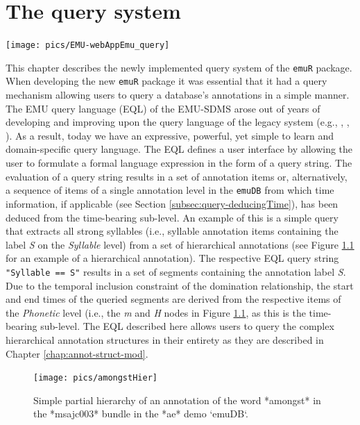 \documentclass[]{book}
\begin{document}
\hypertarget{chap:querysys}{%
\chapter{The query system}\label{chap:querysys}}

\begin{center}\texttt{[image: pics/EMU-webAppEmu\_query]} \end{center}

This chapter describes the newly implemented query system of the \texttt{emuR} package. When developing the new \texttt{emuR} package it was essential that it had a query mechanism allowing users to query a database's annotations in a simple manner. The EMU query language (EQL) of the EMU-SDMS arose out of years of developing and improving upon the query language of the legacy system (e.g., \citet{cassidy:sc2001a}, \citet{harrington:2010a}, \citet{john:2012a}). As a result, today we have an expressive, powerful, yet simple to learn and domain-specific query language. The EQL defines a user interface by allowing the user to formulate a formal language expression in the form of a query string. The evaluation of a query string results in a set of annotation items or, alternatively, a sequence of items of a single annotation level in the \texttt{emuDB} from which time information, if applicable (see Section \ref{subsec:query-deducingTime}), has been deduced from the time-bearing sub-level. An example of this is a simple query that extracts all strong syllables (i.e., syllable annotation items containing the label \emph{S} on the \emph{Syllable} level) from a set of hierarchical annotations (see Figure \ref{fig:amongstHier} for an example of a hierarchical annotation). The respective EQL query string \texttt{"Syllable\ ==\ S"} results in a set of segments containing the annotation label \emph{S}. Due to the temporal inclusion constraint of the domination relationship, the start and end times of the queried segments are derived from the respective items of the \emph{Phonetic} level (i.e., the \emph{m} and \emph{H} nodes in Figure \ref{fig:amongstHier}, as this is the time-bearing sub-level. The EQL described here allows users to query the complex hierarchical annotation structures in their entirety as they are described in Chapter \ref{chap:annot-struct-mod}.

\begin{figure}

{\centering \texttt{[image: pics/amongstHier]} 

}

\caption{Simple partial hierarchy of an annotation of the word *amongst* in the *msajc003* bundle in the *ae* demo `emuDB`.}\label{fig:amongstHier}
\end{figure}
\end{document}
